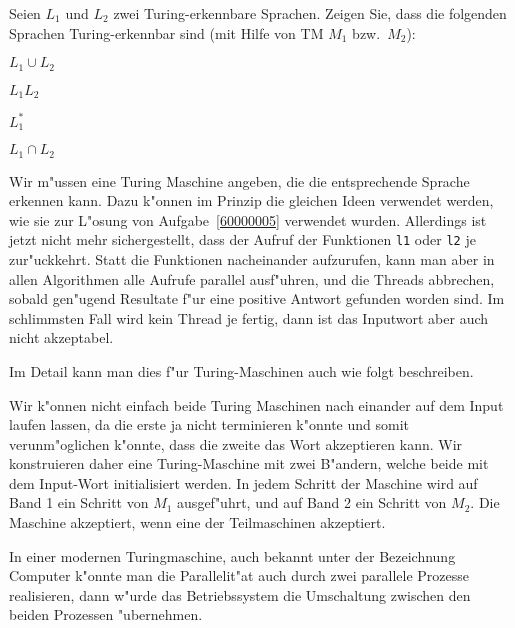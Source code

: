 Seien $L_1$ und $L_2$ zwei Turing-erkennbare Sprachen. Zeigen Sie, dass
die folgenden Sprachen Turing-erkennbar sind (mit Hilfe von TM $M_1$
bzw.~$M_2$):
\begin{teilaufgaben}
\item $L_1\cup L_2$
\item $L_1L_2$
\item $L_1^*$
\item $L_1\cap L_2$
\end{teilaufgaben}

\begin{loesung}
Wir m"ussen eine Turing Maschine angeben, die die entsprechende
Sprache erkennen kann.
Dazu k"onnen im Prinzip die gleichen Ideen verwendet werden, wie sie
zur L"osung von Aufgabe~\ref{60000005} verwendet wurden.
Allerdings ist jetzt nicht mehr sichergestellt, dass der Aufruf
der Funktionen \texttt{l1} oder \texttt{l2} je zur"uckkehrt.
Statt die Funktionen nacheinander aufzurufen, kann man aber in allen
Algorithmen alle Aufrufe parallel ausf"uhren, und die Threads abbrechen,
sobald gen"ugend Resultate f"ur eine positive Antwort gefunden worden
sind. Im schlimmsten Fall wird kein Thread je fertig, dann ist das
Inputwort aber auch nicht akzeptabel.

Im Detail kann man dies f"ur Turing-Maschinen auch wie folgt
beschreiben.
\begin{teilaufgaben}
\item
Wir k"onnen nicht einfach beide Turing Maschinen nach einander
auf dem Input laufen lassen, da die erste ja nicht terminieren k"onnte und
somit verunm"oglichen k"onnte, dass die zweite das Wort akzeptieren kann.
Wir konstruieren daher eine Turing-Maschine mit zwei B"andern, welche
beide mit dem Input-Wort initialisiert werden.
In jedem Schritt der Maschine wird auf Band 1 ein Schritt von $M_1$
ausgef"uhrt, und auf Band 2 ein Schritt von $M_2$.
Die Maschine akzeptiert, wenn eine der Teilmaschinen
akzeptiert.

In einer modernen Turingmaschine, auch bekannt unter der Bezeichnung
Computer k"onnte man die Parallelit"at auch durch zwei parallele
Prozesse realisieren, dann w"urde das Betriebssystem die Umschaltung
zwischen den beiden Prozessen "ubernehmen.


\end{teilaufgaben}
\end{loesung}
